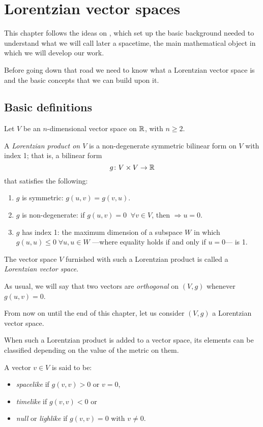 \chapter{Lorentzian vector spaces}

This chapter follows the ideas on \cite{romero10}, which set up the basic background needed to understand what we will call later a spacetime, the main mathematical object in which we will develop our work.

Before going down that road we need to know what a Lorentzian vector space is and the basic concepts that we can build upon it.

\section{Basic definitions}

\begin{definition}
	Let $V$ be an $n$-dimensional vector space on $\mathbb{R}$, with $n \geq 2$.
	
	A \emph{Lorentzian product on $V$} is a non-degenerate symmetric bilinear form on $V$ with index 1; that is, a bilinear form
	\[
		g \colon V \times V \to \mathbb{R}
	\]
	that satisfies the following:
	\begin{enumerate}
		\item $g$ is symmetric: $g(u, v) = g(v, u)$.
		\item $g$ is non-degenerate: if $g(u, v) = 0 \;\; \forall v \in V$, then $\Rightarrow u = 0$.
		\item $g$ has index 1: the maximum dimension of a subspace $W$ in which $g(u,u) \leq 0 \; \forall u,u \in W$ ---where equality holds if and only if $u = 0$--- is 1.
	\end{enumerate}

	The vector space $V$ furnished with such a Lorentzian product is called a \emph{Lorentzian vector space}.
\end{definition}

As usual, we will say that two vectors are \emph{orthogonal} on $(V,g)$ whenever $g(u,v) = 0$.

From now on until the end of this chapter, let us consider $(V,g)$ a Lorentzian vector space.

When such a Lorentzian product is added to a vector space, its elements can be classified depending on the value of the metric on them.

\begin{definition}
	A vector $v \in V$ is said to be:
	\begin{itemize}
		\item \emph{spacelike} if $g(v,v) > 0$ or $v = 0$,
		\item \emph{timelike} if $g(v,v) < 0$ or
		\item \emph{null} or \emph{lighlike} if $g(v,v) = 0$ with $v \neq 0$.
	\end{itemize}
\end{definition}

